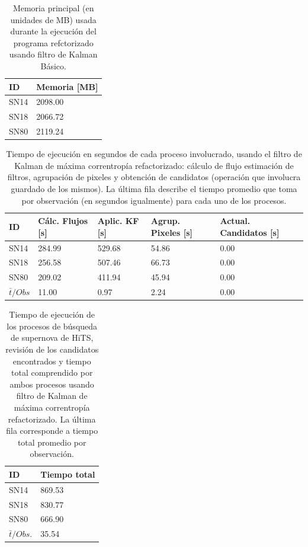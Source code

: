 \begin{table}[h!]
\centering
\begin{tabular}{|l|l|}
\hline
\textbf{ID} & Memoria [MB]\\\hline\hline
SN14 & 2098.00\\\hline
SN18 & 2066.72\\\hline
SN80 & 2119.24\\\hline
\end{tabular}
\caption{Memoria principal (en unidades de MB) usada durante la ejecuci\'on del programa refctorizado usando filtro de Kalman B\'asico.}
\label{tab:mem3}
\end{table}

\begin{table}[h!]
\centering
\begin{tabular}{|l|l|l|l|l|}
\hline
\textbf{ID} & \textbf{C\'alc. Flujos [s]} & \textbf{Aplic. KF [s]} &  \textbf{Agrup. Pixeles [s]}  & \textbf{Actual. Candidatos [s]}\\ \hline \hline
SN14        & 284.99            & 529.68        &  54.86 & 0.00 \\ \hline
SN18            & 256.58             & 507.46         &  66.73  & 0.00\\ \hline
SN80            & 209.02             & 411.94         &   45.94 & 0.00 \\ \hline \hline
$\bar{t}/Obs$ & 11.00 &  0.97 & 2.24 & 0.00\\\hline 
\end{tabular}
\caption{Tiempo de ejecuci\'on en segundos de cada proceso involucrado, usando el filtro de Kalman de m\'axima correntrop\'ia refactorizado: c\'alculo de flujo estimaci\'on de filtros, agrupaci\'on de pixeles y obtenci\'on de candidatos (operaci\'on que involucra guardado de los mismos). La \'ultima fila describe el tiempo promedio que toma por observaci\'on (en segundos igualmente) para cada uno de los procesos. }
\label{tab:t9}
\end{table}

\begin{table}[h!]
\centering
\begin{tabular}{|l|l|}
\hline
\textbf{ID} & \textbf{Tiempo total} \\ \hline
\hline
SN14  & 869.53 \\\hline
SN18  & 830.77\\\hline
SN80  & 666.90 \\\hline\hline
 $\bar{t}/Obs. $& 35.54 \\\hline 
\end{tabular}
\caption{Tiempo de ejecuci\'on de los procesos de b\'usqueda de supernova de HiTS, revisi\'on de los candidatos encontrados y tiempo total comprendido por ambos procesos usando filtro de Kalman de m\'axima correntrop\'ia refactorizado. La \'ultima fila corresponde a tiempo total promedio por observaci\'on.}
\label{tab:t10}
\end{table}

